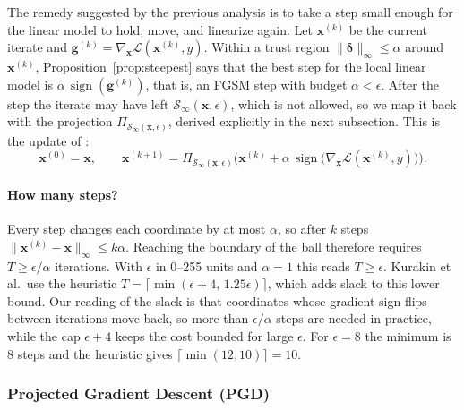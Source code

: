 \documentclass[10pt,a4paper]{extarticle}
\theoremstyle{definition}
\newcommand{\Loss}{\mathcal{L}}
\newcommand{\x}{\mathbf{x}}
\newcommand{\bdelta}{\boldsymbol{\delta}}
\newcommand{\Proj}{\Pi}
\DeclareMathOperator{\sign}{sign}
\begin{document}
The remedy suggested by the previous analysis is to take a step small enough for the linear model to hold, move, and linearize again. Let \(\x^{(k)}\) be the current iterate and \(\mathbf{g}^{(k)}=\nabla_{\x}\Loss(\x^{(k)},y)\). Within a trust region \(\|\bdelta\|_\infty\le\alpha\) around \(\x^{(k)}\), Proposition~\ref{prop:steepest} says that the best step for the local linear model is \(\alpha\,\sign(\mathbf{g}^{(k)})\), that is, an FGSM step with budget \(\alpha<\epsilon\). After the step the iterate may have left \(\mathcal{S}_\infty(\x,\epsilon)\), which is not allowed, so we map it back with the projection \(\Proj_{\mathcal{S}_\infty(\x,\epsilon)}\), derived explicitly in the next subsection. This is the update of \citet{kurakin2017physical}:
\begin{equation}\label{eq:bim}
\x^{(0)} = \x,\qquad
\x^{(k+1)} = \Proj_{\mathcal{S}_\infty(\x,\epsilon)}\Big(\x^{(k)} + \alpha\,\sign\big(\nabla_{\x}\Loss(\x^{(k)},y)\big)\Big).
\end{equation}

\paragraph{How many steps?} Every step changes each coordinate by at most \(\alpha\), so after \(k\) steps \(\|\x^{(k)}-\x\|_\infty\le k\alpha\). Reaching the boundary of the ball therefore requires \(T\ge\epsilon/\alpha\) iterations. With \(\epsilon\) in 0--255 units and \(\alpha=1\) this reads \(T\ge\epsilon\). Kurakin et al.\ use the heuristic \(T=\lceil\min(\epsilon+4,\,1.25\epsilon)\rceil\), which adds slack to this lower bound. Our reading of the slack is that coordinates whose gradient sign flips between iterations move back, so more than \(\epsilon/\alpha\) steps are needed in practice, while the cap \(\epsilon+4\) keeps the cost bounded for large \(\epsilon\). For \(\epsilon=8\) the minimum is 8 steps and the heuristic gives \(\lceil\min(12,10)\rceil=10\).

\subsubsection{Projected Gradient Descent (PGD)}
\end{document}
